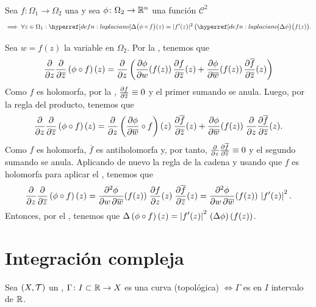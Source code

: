 \begin{lem}\label{lem:laplaciano-cambio-variable}\mbox{}\\
    Sea $f:\Omega_1\to\Omega_2$ una  y sea $\phi \colon \Omega_2\to \mathbb{R}^n$ una función $\mathcal{C}^2$
    \[
    \implies \forall z \in \Omega_1 : \exhyperref[defn:laplaciano]{laplaciano}{\Delta}\big(\phi\circ f\big)(z) = \lvert f'(z)\rvert^2\,\big(\exhyperref[defn:laplaciano]{laplaciano}{\Delta}\phi\big)\big(f(z)\big).
    \]
\end{lem}
\begin{dem}
    Sea $w = f(z)$ la variable en $\Omega_2$. Por la , tenemos que
    \[
    \pdv{}{z}\pdv{}{\overline z}\left(\phi\circ f\right)(z) = \pdv{}{z} \left(\pdv{\phi}{w} (f(z)) \, \pdv{f}{\overline z}(z) + \pdv{\phi}{\overline w}(f(z)) \, \pdv{\overline f}{\overline z}(z)\right)
    \]
    Como $f$ es holomorfa, por la , $\pdv{f}{\overline z} \equiv 0$ y el primer sumando se anula. Luego, por la regla del producto, tenemos que
    \[
    \pdv{}{z}\pdv{}{\overline z}\left(\phi\circ f\right)(z) = \pdv{}{z} \left(\pdv{\phi}{\overline w} \circ f\right)(z) \; \pdv{\overline f}{\overline z}(z) + \pdv{\phi}{\overline w}(f(z)) \; \pdv{}{z}\pdv{\overline f}{\overline z}(z).
    \]
    Como $f$ es holomorfa, $\overline{f}$ es antiholomorfa y, por tanto, $\pdv{}{z} \pdv{\overline f}{\overline z} \equiv 0$ y el segundo sumando se anula. Aplicando de nuevo la regla de la cadena y usando que $f$ es holomorfa para aplicar el , tenemos que
    \[
    \pdv{}{z} \pdv{}{\overline z}\left(\phi\circ f\right)(z) = \pdv{\phi}{w, \overline w}(f(z)) \; \pdv{f}{z}(z) \; \pdv{\overline f}{\overline z}(z) = \pdv{\phi}{w, \overline w}(f(z)) \, \left|f'(z)\right|^2.
    \]
    Entonces, por el , tenemos que $\displaystyle \Delta\left(\phi\circ f\right)(z) = \left|f'(z)\right|^2\,\left(\Delta\phi\right)(f(z))$.
\end{dem}

\cleardoublepage

\section{Integración compleja}

\begin{defn}[Curva]\label{defn:curva-topologica}
    Sea $(X, \mathcal{T})$ un , $\Gamma \colon I \subset \mathbb{R} \to X$ es una curva (topológica) $\iff \Gamma$ es  en $I$ intervalo de $\mathbb{R}$.
\end{defn}

